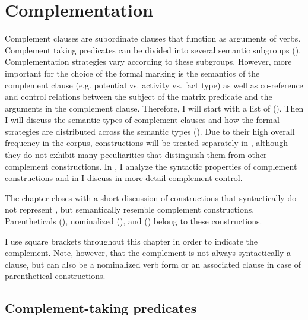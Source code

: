\chapter{Complementation}
\label{cpt:Complementation}

Complement clauses are subordinate clauses that function as arguments of verbs. Complement taking predicates can be divided into several semantic subgroups (). Complementation strategies vary according to these subgroups. However, more important for the choice of the formal marking is the semantics of the complement clause (e.g. potential vs. activity vs. fact type) as well as co-reference and control relations between the subject of the matrix predicate and the arguments in the complement clause. Therefore, I will start with a list of  (). Then I will discuss the semantic types of complement clauses and how the formal strategies are distributed across the semantic types (). Due to their high overall frequency in the corpus,  constructions will be treated separately in , although they do not exhibit many peculiarities that distinguish them from other complement constructions. In , I analyze the syntactic properties of complement constructions and in  I discuss in more detail complement control. 

The chapter closes with a short discussion of constructions that syntactically do not represent , but semantically resemble complement constructions. Parentheticals (), nominalized  (), and  () belong to these constructions.

I use square brackets throughout this chapter in order to indicate the complement. Note, however, that the complement is not always syntactically a clause, but can also be a nominalized verb form or an associated clause in case of parenthetical constructions.



\section{Complement-taking predicates}
\label{sec:Complement-taking predicates}

